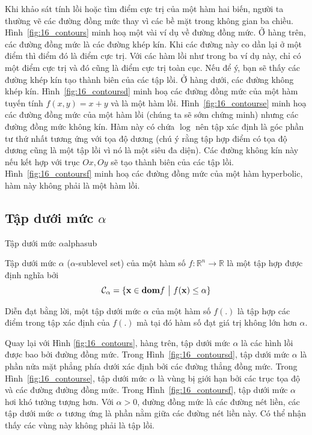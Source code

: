 Khi khảo sát tính lồi hoặc tìm điểm cực trị của một hàm hai biến,
người ta thường vẽ các đường đồng mức thay vì các bề mặt trong không gian ba chiều.
Hình~\ref{fig:16_contours} minh hoạ một vài ví dụ về đường đồng mức. Ở hàng trên,
các đường đồng mức là các đường khép kín. Khi các đường này co dần lại ở một điểm thì điểm đó là điểm cực trị. Với các hàm
lồi như trong ba ví dụ này, chỉ có một điểm cực trị và đó cũng là điểm cực trị toàn cục. Nếu để ý, bạn sẽ thấy các
đường khép kín tạo thành biên của các {tập lồi}. Ở hàng dưới, các đường
không khép kín. Hình~\ref{fig:16_contoursd} minh hoạ các đường đồng mức của một
hàm tuyến tính $f(x, y) = x + y$ và là một hàm lồi.
Hình~\ref{fig:16_contourse} minh hoạ các đường đồng mức của một hàm lồi (chúng
ta sẽ sớm chứng minh) nhưng các đường đồng mức không kín.
Hàm này có chứa $\log$ nên tập xác định là góc phần tư thứ nhất tương ứng với tọa độ dương (chú ý rằng tập hợp điểm có tọa độ dương cũng là một
{tập lồi} vì nó là một siêu đa diện). Các {đường không kín} này nếu
kết hợp với trục $Ox, Oy$ sẽ tạo thành biên của các {tập lồi}.
Hình~\ref{fig:16_contoursf} minh hoạ các đường đồng mức của một hàm hyperbolic, hàm
này không phải là một hàm lồi.

\subsection{Tập dưới mức $\alpha$}

\begin{mydef}{Tập dưới mức $\alpha$}{alphasub}

Tập dưới mức $\alpha$ ($\alpha$-sublevel set) của một hàm số $f : \mathbb{R}^n \rightarrow
\mathbb{R}$ là một tập hợp được định nghĩa bởi
\begin{equation*}
\mathcal{C}_{\alpha} = \{\mathbf{x} \in \text{\bf dom} f ~\big|~ f(\mathbf{x}) \leq \alpha\}
\end{equation*}
\end{mydef}
Diễn đạt bằng lời, một tập dưới mức $\alpha$ của một hàm số $f(.)$ là tập hợp các
điểm trong tập xác định của $f(.)$ mà tại đó hàm số đạt giá trị không lớn hơn
$\alpha$.


Quay lại với Hình \ref{fig:16_contours}, hàng trên, tập dưới mức $\alpha$ là các hình lồi được bao bởi đường đồng mức. Trong Hình~\ref{fig:16_contoursd}, tập dưới mức $\alpha$ là phần nửa mặt phẳng phía dưới xác định bởi
các đường thẳng đồng mức. Trong Hình~\ref{fig:16_contourse}, tập dưới mức $\alpha$ là vùng bị giới hạn bởi các trục tọa độ và các đường đường đồng mức. Trong
Hình~\ref{fig:16_contoursf}, tập dưới mức $\alpha$ hơi khó tưởng tượng hơn. Với $\alpha > 0$, đường đồng mức là các đường nét liền, các tập dưới mức
$\alpha$ tương ứng là phần nằm giữa các đường nét liền này. Có thể
nhận thấy các vùng này không phải là tập lồi.

